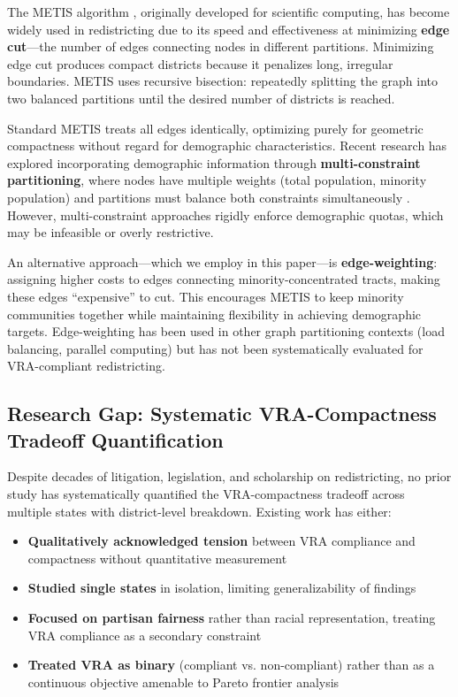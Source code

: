 The METIS algorithm \citep{karypis1998}, originally developed for scientific computing, has become widely used in redistricting due to its speed and effectiveness at minimizing \textbf{edge cut}---the number of edges connecting nodes in different partitions. Minimizing edge cut produces compact districts because it penalizes long, irregular boundaries. METIS uses recursive bisection: repeatedly splitting the graph into two balanced partitions until the desired number of districts is reached.

Standard METIS treats all edges identically, optimizing purely for geometric compactness without regard for demographic characteristics. Recent research has explored incorporating demographic information through \textbf{multi-constraint partitioning}, where nodes have multiple weights (total population, minority population) and partitions must balance both constraints simultaneously \citep{levin2020}. However, multi-constraint approaches rigidly enforce demographic quotas, which may be infeasible or overly restrictive.

An alternative approach---which we employ in this paper---is \textbf{edge-weighting}: assigning higher costs to edges connecting minority-concentrated tracts, making these edges ``expensive'' to cut. This encourages METIS to keep minority communities together while maintaining flexibility in achieving demographic targets. Edge-weighting has been used in other graph partitioning contexts (load balancing, parallel computing) but has not been systematically evaluated for VRA-compliant redistricting.

\subsection{Research Gap: Systematic VRA-Compactness Tradeoff Quantification}

Despite decades of litigation, legislation, and scholarship on redistricting, no prior study has systematically quantified the VRA-compactness tradeoff across multiple states with district-level breakdown. Existing work has either:
\begin{itemize}
    \item \textbf{Qualitatively acknowledged tension} between VRA compliance and compactness without quantitative measurement \citep{pildes1993,issacharoff2002}
    \item \textbf{Studied single states} in isolation, limiting generalizability of findings \citep{mccartan2020}
    \item \textbf{Focused on partisan fairness} rather than racial representation, treating VRA compliance as a secondary constraint \citep{deford2021,king2022}
    \item \textbf{Treated VRA as binary} (compliant vs. non-compliant) rather than as a continuous objective amenable to Pareto frontier analysis \citep{levin2020}
\end{itemize}

